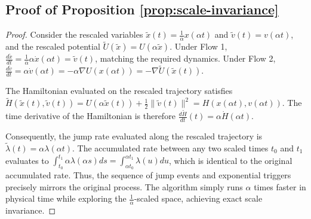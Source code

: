 \documentclass{article}
\begin{document}
\subsection{Proof of Proposition \ref{prop:scale-invariance}}
\begin{proof}
    Consider the rescaled variables $\tilde{x}(t) = \frac{1}{\alpha} x(\alpha t)$ and $\tilde{v}(t) = v(\alpha t)$, and the rescaled potential $\tilde{U}(\tilde{x}) = U(\alpha \tilde{x})$. Under Flow 1, $\frac{d\tilde{x}}{dt} = \frac{1}{\alpha} \alpha \dot{x}(\alpha t) = \tilde{v}(t)$, matching the required dynamics. Under Flow 2, $\frac{d\tilde{v}}{dt} = \alpha \dot{v}(\alpha t) = -\alpha \nabla U(x(\alpha t)) = -\nabla \tilde{U}(\tilde{x}(t))$. 
    
    The Hamiltonian evaluated on the rescaled trajectory satisfies $\tilde{H}(\tilde{x}(t), \tilde{v}(t)) = U(\alpha \tilde{x}(t)) + \frac{1}{2} \|\tilde{v}(t)\|^2 = H(x(\alpha t), v(\alpha t))$. The time derivative of the Hamiltonian is therefore $\frac{d\tilde{H}}{dt}(t) = \alpha \dot{H}(\alpha t)$. 
    
    Consequently, the jump rate evaluated along the rescaled trajectory is $\tilde{\lambda}(t) = \alpha \lambda(\alpha t)$. The accumulated rate between any two scaled times $t_0$ and $t_1$ evaluates to $\int_{t_0}^{t_1} \alpha \lambda(\alpha s) ds = \int_{\alpha t_0}^{\alpha t_1} \lambda(u) du$, which is identical to the original accumulated rate. Thus, the sequence of jump events and exponential triggers precisely mirrors the original process. The algorithm simply runs $\alpha$ times faster in physical time while exploring the $\frac{1}{\alpha}$-scaled space, achieving exact scale invariance.
\end{proof}
\end{document}
